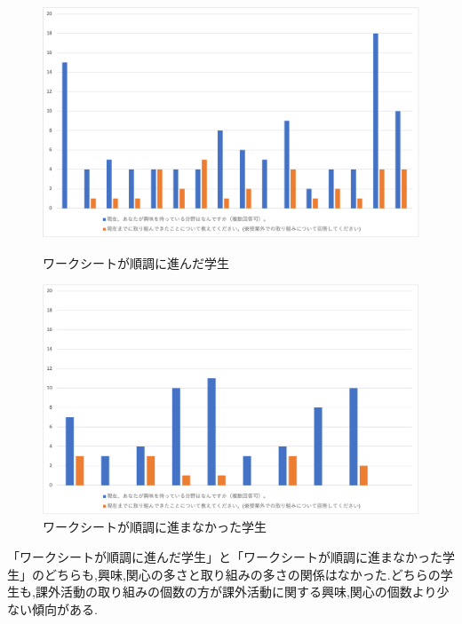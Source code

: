 \documentclass[11pt, a4paper]{jreport}
\begin{document}
\begin{figure}[htbp]
  \begin{minipage}[c]{.5\linewidth}
    \centering
    \includegraphics[width=1\linewidth]{img/kyoumi_vs_torikumi_yes.png}
    \caption{ワークシートが順調に進んだ学生}
    \label{fig:kyoumi_vs_torikumi_yes}
  \end{minipage}
  \begin{minipage}[c]{.5\linewidth}
    \centering
    \includegraphics[width=1\linewidth]{img/kyoumi_vs_torikumi_not.png}
    \caption{ワークシートが順調に進まなかった学生}
    \label{fig:kyoumi_vs_torikumi_not}
  \end{minipage}
\end{figure}


「ワークシートが順調に進んだ学生」と「ワークシートが順調に進まなかった学生」のどちらも,興味,関心の多さと取り組みの多さの関係はなかった.どちらの学生も,課外活動の取り組みの個数の方が課外活動に関する興味,関心の個数より少ない傾向がある.

\newpage
\end{document}
